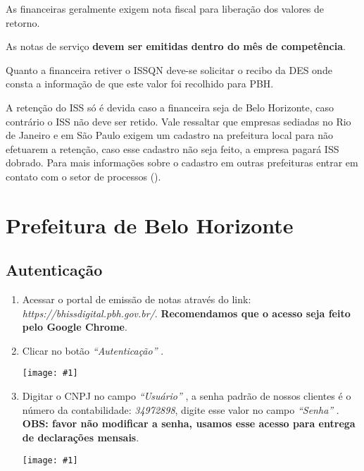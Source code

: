 \documentclass{article}
\newcommand{\itasp}[1]{
  \textit{``#1''}
}
\newcommand{\imagem}[2]{
  \begin{center}
    \texttt{[image: \#1]}
  \end{center}
}
\begin{document}
As financeiras geralmente exigem nota fiscal para liberação dos valores de retorno.

As notas de serviço \textbf{devem ser emitidas dentro do mês de competência}.

Quanto a financeira retiver o ISSQN deve-se solicitar o recibo da DES onde consta a informação de que este valor foi recolhido para PBH.

\begin{tcolorbox}[title=Atenção!]
  A retenção do ISS só é devida caso a financeira seja de Belo Horizonte, caso contrário o ISS não deve ser retido. Vale ressaltar que empresas sediadas no Rio de Janeiro e em São Paulo exigem um cadastro na prefeitura local para não efetuarem a retenção, caso esse cadastro não seja feito, a empresa pagará ISS dobrado. Para mais informações sobre o cadastro em outras prefeituras entrar em contato com o setor de processos (\emailprocessos).
\end{tcolorbox}


\section{Prefeitura de Belo Horizonte}
\label{sec:servico-pbh}
\subsection{Autenticação}
\label{servico-pbh:aut}
\begin{enumerate}
  \item Acessar o portal de emissão de notas através do link: \textit{https://bhissdigital.pbh.gov.br/}. \textbf{Recomendamos que o acesso seja feito pelo Google Chrome}.
  \item Clicar no botão \itasp{Autenticação}. \imagem{autenticar-pbh}{0.8}
  \pagebreak
  \item Digitar o CNPJ no campo \itasp{Usuário}, a senha padrão de nossos clientes é o número da contabilidade: \textit{34972898}, digite esse valor no campo \itasp{Senha}. \textbf{OBS: favor não modificar a senha, usamos esse acesso para entrega de declarações mensais}. \imagem{login-form-pbh}{0.5}
\end{enumerate}
\end{document}
